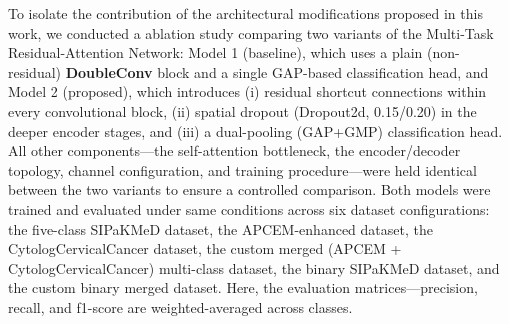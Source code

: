 \documentclass[pdflatex,sn-nature]{sn-jnl}%
\theoremstyle{thmstyleone}%
\theoremstyle{thmstyletwo}%
\theoremstyle{thmstylethree}%
\begin{document}
To isolate the contribution of the architectural modifications proposed in this work, we conducted a ablation study comparing two variants of the Multi-Task Residual-Attention Network: Model 1 (baseline), which uses a plain (non-residual) \textbf{DoubleConv} block and a single GAP-based classification head, and Model 2 (proposed), which introduces (i) residual shortcut connections within every convolutional block, (ii) spatial dropout (Dropout2d, 0.15/0.20) in the deeper encoder stages, and (iii) a dual-pooling (GAP+GMP) classification head. All other components—the self-attention bottleneck, the encoder/decoder topology, channel configuration, and training procedure—were held identical between the two variants to ensure a controlled comparison. Both models were trained and evaluated under same conditions across six dataset configurations: the five-class SIPaKMeD dataset, the APCEM-enhanced dataset, the CytologCervicalCancer dataset, the custom merged (APCEM + CytologCervicalCancer) multi-class dataset, the binary SIPaKMeD dataset, and the custom binary merged dataset. Here, the evaluation matrices—precision, recall, and f1-score are weighted-averaged across classes.
\end{document}
